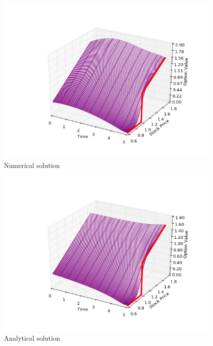 \documentclass[11pt,a4paper]{extarticle}
\begin{document}
\begin{minipage}{\linewidth}
      \centering
      \begin{minipage}{0.3\linewidth}
          \begin{figure}[H]
              \includegraphics[width=\linewidth]{Figures/a-o-n-call-num}
              \caption{Numerical solution}
          \end{figure}
      \end{minipage}
      \hspace{0.05\linewidth}
      \begin{minipage}{0.3\linewidth}
          \begin{figure}[H]
              \includegraphics[width=\linewidth]{Figures/a-o-n-call-analyt}
              \caption{Analytical solution}
          \end{figure}
      \end{minipage}
  \end{minipage}
\end{document}
